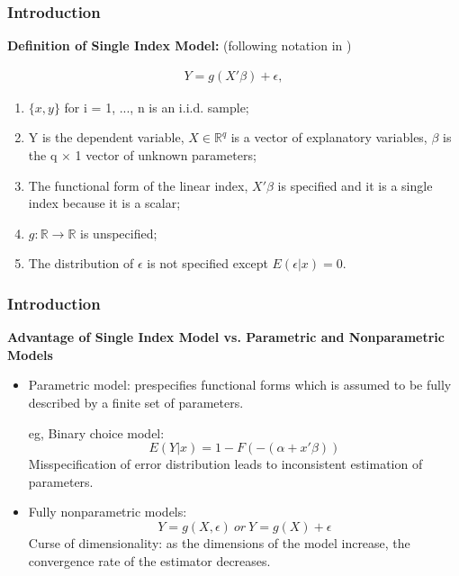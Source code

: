 \documentclass{beamer}
\begin{document}
\begin{frame}[t]
    \frametitle{Introduction}
	 \textbf{Definition of Single Index Model:} 
	 (following notation in \citet{LiRacine07})
 
	 \begin{eqnarray}
		Y = g(X'\beta) + \epsilon,  %
 	 \end{eqnarray}

		\begin{enumerate}
			\item $\{x , y \}$ for i = 1, ..., n is an i.i.d. sample;
			\item Y is the dependent variable, $X\in \mathbb{R}^{q}$ is a vector of explanatory variables, $\beta$ is the q $\times$ 1 						vector of unknown parameters; 
			\item The functional form of the linear index, $X'\beta$ is specified and it is a single index because it is a scalar;
			\item $g: \mathbb{R} \rightarrow \mathbb{R} $ is unspecified; %
			\item The distribution of $\epsilon$ is not specified except $ E(\epsilon|x) = 0 $.
	   \end{enumerate}

\note{~}      
\end{frame}

\begin{frame}[t]
	\frametitle{Introduction}
	\textbf{Advantage of Single Index Model vs. Parametric and Nonparametric Models}
	\begin{itemize}
	\item Parametric model: prespecifies functional forms which is assumed to be fully described by a finite set of parameters.
			
			eg, Binary choice model: 
			\[E(Y|x) = 1 - F(-(\alpha + x'\beta))\]
			Misspecification of error distribution leads to inconsistent estimation of parameters.
			
	\item Fully nonparametric models: \[Y = g(X, \epsilon)\ or\ Y = g(X) + \epsilon\]
	      Curse of dimensionality: as the dimensions of the model increase, the convergence rate of the estimator decreases.
	
	\end{itemize}
	

\note{~}
\end{frame}
\end{document}
